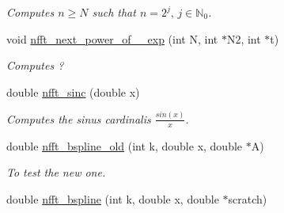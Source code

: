 \begin{CompactItemize}
\begin{CompactList}\small\item\em Computes $n\ge N$ such that $n=2^j,\, j\in\mathbb{N}_0$. \item\end{CompactList}\item 
\hypertarget{group__nfftutil_g2c58df6a4bcf2274288ee7a9e5256423}{
void \hyperlink{group__nfftutil_g2c58df6a4bcf2274288ee7a9e5256423}{nfft\_\-next\_\-power\_\-of\_\_\-exp} (int N, int $\ast$N2, int $\ast$t)}
\label{group__nfftutil_g2c58df6a4bcf2274288ee7a9e5256423}

\begin{CompactList}\small\item\em Computes ? \item\end{CompactList}\item 
\hypertarget{group__nfftutil_g120a748e397a224ed520ac3019e9bfa9}{
double \hyperlink{group__nfftutil_g120a748e397a224ed520ac3019e9bfa9}{nfft\_\-sinc} (double x)}
\label{group__nfftutil_g120a748e397a224ed520ac3019e9bfa9}

\begin{CompactList}\small\item\em Computes the sinus cardinalis $\frac{sin\left(x\right)}{x}$. \item\end{CompactList}\item 
\hypertarget{group__nfftutil_g89bd624abdfb13abc10c144a8ff949cd}{
double \hyperlink{group__nfftutil_g89bd624abdfb13abc10c144a8ff949cd}{nfft\_\-bspline\_\-old} (int k, double x, double $\ast$A)}
\label{group__nfftutil_g89bd624abdfb13abc10c144a8ff949cd}

\begin{CompactList}\small\item\em To test the new one. \item\end{CompactList}\item 
\hypertarget{group__nfftutil_g2fd48f1f700153c050d27691c4b2a6cc}{
double \hyperlink{group__nfftutil_g2fd48f1f700153c050d27691c4b2a6cc}{nfft\_\-bspline} (int k, double x, double $\ast$scratch)}
\label{group__nfftutil_g2fd48f1f700153c050d27691c4b2a6cc}


\end{CompactItemize}
